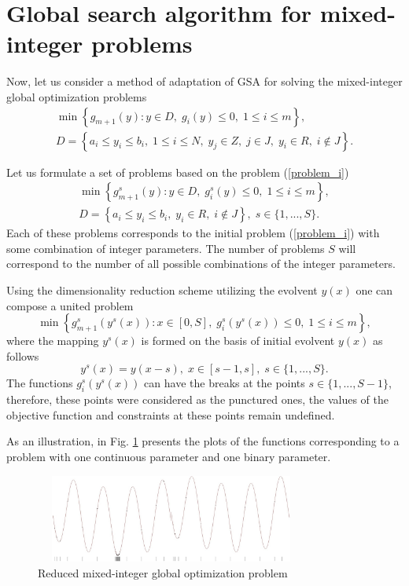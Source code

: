 \documentclass{llncs}
\begin{document}
\section{Global search algorithm for mixed-integer problems}

Now, let us consider a method of adaptation of GSA for solving the mixed-integer global 
optimization problems 
\begin{gather}\label{problem_i}
\min{\left\{ g_{m+1}(y):y\in D, \; g_i(y)\leq 0, \; 1 \leq i \leq m\right\}},\\
D=\left\{a_i\leq y_i \leq b_i, \; 1\leq i \leq N, \; y_j \in Z, \; j \in J, \; y_i \in R, \; i \notin J \right\}.\nonumber
\end{gather}

Let us formulate a set of problems based on the problem (\ref{problem_i})
\begin{gather}\label{problem_is}
\min{\left\{ g_{m+1}^s(y):y\in D, \; g_i^s(y)\leq 0, \; 1 \leq i \leq m\right\}},\\
D=\left\{ a_i\leq y_i \leq b_i, \;  y_i \in R, \; i \notin J \right\}, \; s\in\{1,...,S\}.\nonumber 
\end{gather}
Each of these problems corresponds to the initial problem (\ref{problem_i}) with some combination of 
integer parameters. The number of problems $S$ will correspond to the number of all possible 
combinations of the integer parameters.

Using the dimensionality reduction scheme utilizing the evolvent $y(x)$ 
one can compose a united problem 
\begin{equation}\label{problem_is1}
\min \left\{g_{m+1}^s(y^s(x)): x \in [0,S], \; g_i^s(y^s(x)) \leq 0, \; 1 \leq i \leq m\right\},
\end{equation}
where the mapping $y^s(x)$ is formed on the basis of initial evolvent $y(x)$ as follows
\[
y^s(x)=y(x-s), \; x\in[s-1,s],\; s\in\{1,...,S\}.
\]
The functions $g_i^s(y^s(x))$ can have the breaks at the points $s\in \{1,...,S-1\}$, therefore, 
these points were considered as the punctured ones, the values of the objective function and 
constraints at these points remain undefined.

As an illustration, in Fig. \ref{fig:1} presents the plots of the functions corresponding to a 
problem with one continuous parameter and one binary parameter.

\begin{figure}[ht]
    \centering
    \includegraphics[height=2.9cm,width=0.8\textwidth]{fig1.jpg}
    \caption{Reduced mixed-integer global optimization problem}
    \label{fig:1}
\end{figure}
\end{document}

